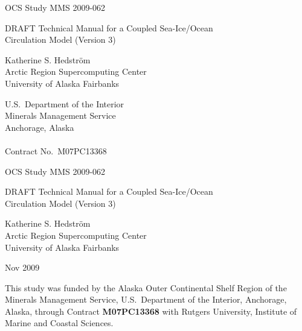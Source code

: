 %
%


\pagestyle{empty}
\centerline{\hfill OCS Study MMS 2009-062}
\vspace {2 cm}
\begin{center}
  {\LARGE DRAFT Technical Manual for a Coupled Sea-Ice/Ocean \\ Circulation
   Model (Version 3)  }
\end{center}
\vspace {2 cm}
\begin{center}
  Katherine S. Hedstr\"{o}m \\ Arctic Region Supercomputing Center
  \\ University of Alaska Fairbanks
\end{center}
\vspace {2 cm}
\begin{center}
  U.S.\ Department of the Interior \\ Minerals Management Service \\
  Anchorage, Alaska \\ \mbox{} \\ Contract No.\ M07PC13368
\end{center}
\newpage
\centerline{\hfill OCS Study MMS 2009-062}
\vspace {2 cm}
\begin{center}
  {\LARGE DRAFT Technical Manual for a Coupled Sea-Ice/Ocean \\ Circulation
   Model (Version 3)  }
\end{center}
\vspace {2 cm}
\begin{center}
  Katherine S. Hedstr\"{o}m \\ Arctic Region Supercomputing Center
  \\ University of Alaska Fairbanks
\end{center}
\vspace {2 cm}
\centerline{Nov 2009}
\vfill


This study was funded by the Alaska Outer Continental Shelf Region
of the Minerals Management Service, U.S.\ Department of the
Interior, Anchorage, Alaska, through Contract
{\bf M07PC13368} with Rutgers University, Institute of Marine
and Coastal Sciences.

